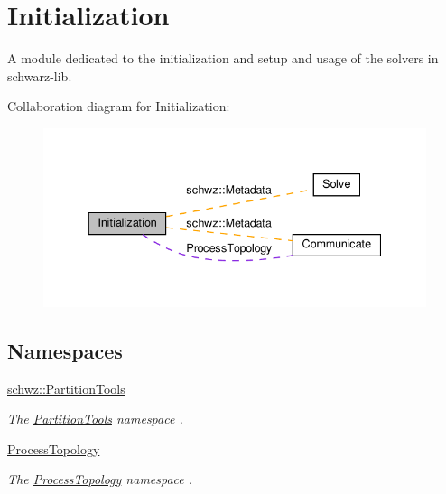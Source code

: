\hypertarget{group__init}{}\section{Initialization}
\label{group__init}


A module dedicated to the initialization and setup and usage of the solvers in schwarz-\/lib.  


Collaboration diagram for Initialization\+:
\nopagebreak
\begin{figure}[H]
\begin{center}
\leavevmode
\includegraphics[width=337pt]{group__init}
\end{center}
\end{figure}
\subsection*{Namespaces}
\begin{DoxyCompactItemize}
\item 
 \hyperlink{namespaceschwz_1_1PartitionTools}{schwz\+::\+Partition\+Tools}
\begin{DoxyCompactList}\small\item\em The \hyperlink{namespaceschwz_1_1PartitionTools}{Partition\+Tools} namespace . \end{DoxyCompactList}\item 
 \hyperlink{namespaceProcessTopology}{Process\+Topology}
\begin{DoxyCompactList}\small\item\em The \hyperlink{namespaceProcessTopology}{Process\+Topology} namespace . \end{DoxyCompactList}\end{DoxyCompactItemize}
